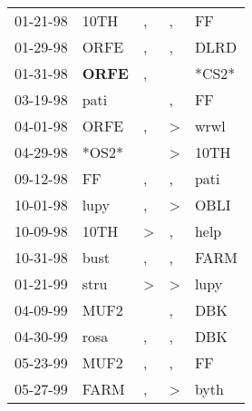 \begin{supertabular}{p{0.07\textwidth}p{0.06\textwidth}p{0.02\textwidth}p{0.02\textwidth}p{0.06\textwidth}}
 01-21-98\textsuperscript{} &           10TH\textsuperscript{} &                , &             , &    FF\textsuperscript{} \\
 01-29-98\textsuperscript{} &           ORFE\textsuperscript{} &                , &             , &  DLRD\textsuperscript{} \\
 01-31-98\textsuperscript{} &  \textbf{ORFE\textsuperscript{}} &                , &               &                   *CS2* \\
 03-19-98\textsuperscript{} &           pati\textsuperscript{} &                  &             , &    FF\textsuperscript{} \\
 04-01-98\textsuperscript{} &           ORFE\textsuperscript{} &                , &  \textgreater &  wrwl\textsuperscript{} \\
 04-29-98\textsuperscript{} &                            *OS2* &                  &  \textgreater &  10TH\textsuperscript{} \\
 09-12-98\textsuperscript{} &             FF\textsuperscript{} &                , &             , &  pati\textsuperscript{} \\
 10-01-98\textsuperscript{} &           lupy\textsuperscript{} &                , &  \textgreater &  OBLI\textsuperscript{} \\
 10-09-98\textsuperscript{} &           10TH\textsuperscript{} &     \textgreater &             , &  help\textsuperscript{} \\
 10-31-98\textsuperscript{} &           bust\textsuperscript{} &                , &             , &  FARM\textsuperscript{} \\
 01-21-99\textsuperscript{} &           stru\textsuperscript{} &     \textgreater &  \textgreater &  lupy\textsuperscript{} \\
 04-09-99\textsuperscript{} &           MUF2\textsuperscript{} &                  &             , &   DBK\textsuperscript{} \\
 04-30-99\textsuperscript{} &           rosa\textsuperscript{} &                , &             , &   DBK\textsuperscript{} \\
 05-23-99\textsuperscript{} &           MUF2\textsuperscript{} &                , &             , &    FF\textsuperscript{} \\
 05-27-99\textsuperscript{} &           FARM\textsuperscript{} &                , &  \textgreater &  byth\textsuperscript{} \\

\end{supertabular}
